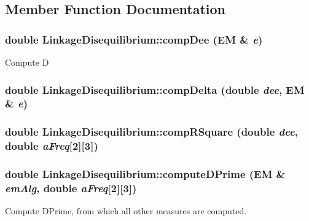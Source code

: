 \subsection{Member Function Documentation}
\hypertarget{classLinkageDisequilibrium_a368b63fa8f9f18804ad9f588c6bb4dbb}{
\subsubsection[{compDee}]{\setlength{\rightskip}{0pt plus 5cm}double LinkageDisequilibrium::compDee ({\bf EM} \& {\em e})}}
\label{classLinkageDisequilibrium_a368b63fa8f9f18804ad9f588c6bb4dbb}
Compute D \hypertarget{classLinkageDisequilibrium_a6a3f41206e3713204eaab35faf89c65b}{
\subsubsection[{compDelta}]{\setlength{\rightskip}{0pt plus 5cm}double LinkageDisequilibrium::compDelta (double {\em dee}, \/  {\bf EM} \& {\em e})}}
\label{classLinkageDisequilibrium_a6a3f41206e3713204eaab35faf89c65b}
\hypertarget{classLinkageDisequilibrium_a94dde069bebfff0977e49d556c29fad4}{
\subsubsection[{compRSquare}]{\setlength{\rightskip}{0pt plus 5cm}double LinkageDisequilibrium::compRSquare (double {\em dee}, \/  double {\em aFreq}\mbox{[}2\mbox{]}\mbox{[}3\mbox{]})}}
\label{classLinkageDisequilibrium_a94dde069bebfff0977e49d556c29fad4}
\hypertarget{classLinkageDisequilibrium_a6207b7cc0fa21495363246ec41ee3164}{
\subsubsection[{computeDPrime}]{\setlength{\rightskip}{0pt plus 5cm}double LinkageDisequilibrium::computeDPrime ({\bf EM} \& {\em emAlg}, \/  double {\em aFreq}\mbox{[}2\mbox{]}\mbox{[}3\mbox{]})}}
\label{classLinkageDisequilibrium_a6207b7cc0fa21495363246ec41ee3164}
Compute DPrime, from which all other measures are computed.


